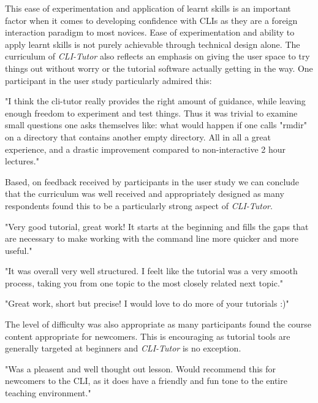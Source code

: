 This ease of experimentation and application of learnt skills is an
important factor when it comes to developing confidence with CLIs as they are a
foreign interaction paradigm to most novices. Ease of experimentation and
ability to apply learnt skills is not purely achievable through technical
design alone. The curriculum of \textit{CLI-Tutor} also reflects an emphasis on
giving the user space to try things out without worry or the tutorial software
actually getting in the way. One participant in the user study particularly
admired this:

\begin{quotes}
	"I think the cli-tutor really provides the right amount of guidance, while
	leaving enough freedom to experiment and test things. Thus it was trivial to
	examine small questions one asks themselves like:  what would happen if one
	calls "rmdir" on a directory that contains another empty directory.  All in all
	a great experience, and a drastic improvement compared to non-interactive  2
	hour lectures."
\end{quotes}

Based, on feedback received by participants in the user study we can conclude
that the curriculum was well received and appropriately designed as many
respondents found this to be a particularly strong aspect of
\textit{CLI-Tutor}.

\begin{quotes}
	"Very good tutorial, great work! It starts at the beginning and fills the gaps
	that are necessary to make working with the command line more quicker and more
	useful."
\end{quotes}

\begin{quotes}
	"It was overall very well structured. I feelt like the tutorial was a very
	smooth process, taking you from one topic to the most closely related next
	topic."
\end{quotes}

\begin{quotes}
	"Great work, short but precise! I would love to do more of your tutorials :)"
\end{quotes}

The level of difficulty was also appropriate as many participants found the
course content appropriate for newcomers. This is encouraging as tutorial tools
are generally targeted at beginners and \textit{CLI-Tutor} is no exception.

\begin{quotes}
	"Was a pleasent and well thought out lesson. Would recommend this for newcomers
	to the CLI, as it does have a friendly and fun tone to the entire teaching
	environment."
\end{quotes}

